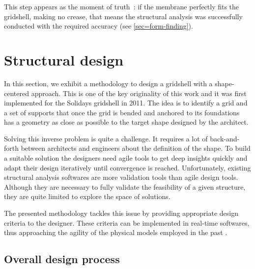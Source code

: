 This step appears as the moment of truth~: if the membrane perfectly fits the gridshell, making no crease, that means the structural analysis was successfully conducted with the required accuracy (see \cref{sec=form-finding}).

\section{Structural design}\label{sec=proj_design}

In this section, we exhibit a methodology to design a gridshell with a shape-centered approach. This is one of the key originality of this work and it was first implemented for the Solidays gridshell in 2011. The idea is to identify a grid and a set of supports that once the grid is bended and anchored to its foundations has a geometry as close as possible to the target shape designed by the architect.

Solving this inverse problem is quite a challenge. It requires a lot of back-and-forth between architects and engineers about the definition of the shape. To build a suitable solution the designers need agile tools to get deep insights quickly and adapt their design iteratively until convergence is reached. Unfortunately, existing structural analysis softwares are more validation tools than agile design tools. Although they are necessary to fully validate the feasibility of a given structure, they are quite limited to explore the space of solutions.

The presented methodology tackles this issue by providing appropriate design criteria to the designer. These criteria can be implemented in real-time softwares, thus approaching the agility of the physical models employed in the past \cite{Addis2013}.

\subsection{Overall design process}


